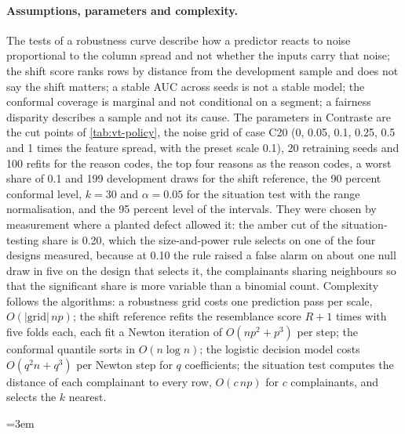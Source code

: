 \paragraph{Assumptions, parameters and complexity.} The tests of a robustness curve describe how a predictor reacts to noise proportional to the column spread and not whether the inputs carry that noise; the shift score ranks rows by distance from the development sample and does not say the
shift matters; a stable AUC across seeds is not a stable model; the conformal coverage is marginal and not conditional on a segment; a fairness disparity describes a sample and not its cause. The parameters in Contraste are the cut points of \cref{tab:vt-policy}, the noise grid of case C20 (0, 0.05, 0.1, 0.25, 0.5 and 1 times the feature
spread, with the preset scale 0.1), 20 retraining seeds and 100 refits for the reason codes, the top four reasons as the reason codes, a worst share of 0.1 and 199 development draws for the shift reference, the 90 percent conformal level, $k=30$ and $\alpha=0.05$ for the situation test with the range normalisation, and the 95 percent level of the
intervals. They were chosen by measurement where a planted defect allowed it: the amber cut of the situation-testing share is 0.20, which the size-and-power rule selects on one of the four designs measured, because at 0.10 the rule raised a false alarm on about one null draw in five on the design that selects it, the complainants sharing neighbours so that the significant share is more variable than a binomial count. Complexity follows the
algorithms: a robustness grid costs one prediction pass per scale, $O(|\text{grid}|\,np)$; the shift reference refits the resemblance score $R+1$ times with five folds each, each fit a Newton iteration of $O(np^2+p^3)$ per step; the conformal quantile sorts in $O(n\log n)$; the logistic decision model costs $O(q^2n+q^3)$ per Newton step for $q$
coefficients; the situation test computes the distance of each complainant to every row, $O(c\,np)$ for $c$ complainants, and selects the $k$ nearest.

\begingroup\emergencystretch=3em
